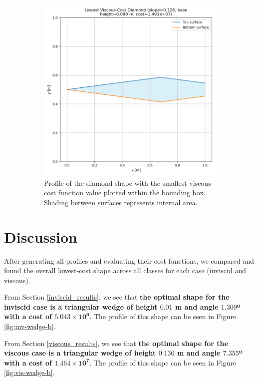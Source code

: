\documentclass[11pt]{article}
\begin{document}
\begin{figure}[H]
\begin{subfigure}[b]{0.44\textwidth}
    \includegraphics[width=\linewidth]{../results/viscous/lowest_cost_diamond.png}
    \caption{Profile of the diamond shape with the smallest viscous cost function value plotted within the bounding box. Shading between surfaces represents internal area.}
    \label{fig:vis-diamond-b}
\end{subfigure}
\caption{}
\label{fig:vis-diamond}
\end{figure}

\section{Discussion}
After generating all profiles and evaluating their cost functions, we compared and found the overall lowest-cost shape across all classes for each case (inviscid and viscous).

From Section \ref{inviscid_results}, we see that \textbf{the optimal shape for the inviscid case is a triangular wedge of height $\mathbf{0.01}$ m and angle $\mathbf{1.309}$º with a cost of $\mathbf{5.043 \times 10^6}$}. The profile of this shape can be seen in Figure \ref{fig:inv-wedge-b}.

From Section \ref{viscous_results}, we see that \textbf{the optimal shape for the viscous case is a triangular wedge of height $\mathbf{0.136}$ m and angle $\mathbf{7.355}$º with a cost of $\mathbf{1.464 \times 10^7}$}. The profile of this shape can be seen in Figure \ref{fig:vis-wedge-b}.
\end{document}
